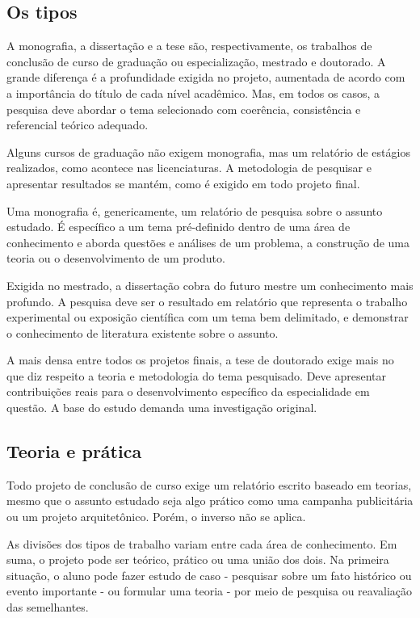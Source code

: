 \subsection{Os tipos}
A monografia, a dissertação e a tese são, respectivamente, os trabalhos de conclusão de curso de graduação ou especialização, mestrado e doutorado. A grande diferença é a profundidade exigida no projeto, aumentada de acordo com a importância do título de cada nível acadêmico. Mas, em todos os casos, a pesquisa deve abordar o tema selecionado com coerência, consistência e referencial teórico adequado.

Alguns cursos de graduação não exigem monografia, mas um relatório de estágios realizados, como acontece nas licenciaturas. A metodologia de pesquisar e apresentar resultados se mantém, como é exigido em todo projeto final.

Uma monografia é, genericamente, um relatório de pesquisa sobre o assunto estudado. É específico a um tema pré-definido dentro de uma área de conhecimento e aborda questões e análises de um problema, a construção de uma teoria ou o desenvolvimento de um produto.

Exigida no mestrado, a dissertação cobra do futuro mestre um conhecimento mais profundo. A pesquisa deve ser o resultado em relatório que representa o trabalho experimental ou exposição científica com um tema bem delimitado, e demonstrar o conhecimento de literatura existente sobre o assunto.

A mais densa entre todos os projetos finais, a tese de doutorado exige mais no que diz respeito a teoria e metodologia do tema pesquisado. Deve apresentar contribuições reais para o desenvolvimento específico da especialidade em questão. A base do estudo demanda uma investigação original.

\subsection{Teoria e prática}
Todo projeto de conclusão de curso exige um relatório escrito baseado em teorias, mesmo que o assunto estudado seja algo prático como uma campanha publicitária ou um projeto arquitetônico. Porém, o inverso não se aplica.

As divisões dos tipos de trabalho variam entre cada área de conhecimento. Em suma, o projeto pode ser teórico, prático ou uma união dos dois. Na primeira situação, o aluno pode fazer estudo de caso - pesquisar sobre um fato histórico ou evento importante - ou formular uma teoria - por meio de pesquisa ou reavaliação das semelhantes.

